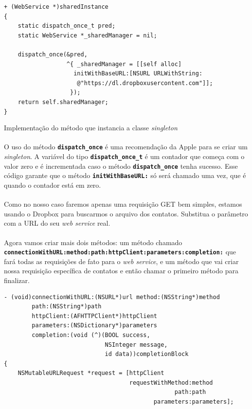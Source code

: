 \documentclass[a4paper,12pt,brazil,doubleside]{book}
\begin{document}
\begin{singlespace}
\begin{listing}[H]
\begin{verbatim}
+ (WebService *)sharedInstance
{
    static dispatch_once_t pred;
    static WebService *_sharedManager = nil;
    
    dispatch_once(&pred,
                  ^{ _sharedManager = [[self alloc]
                    initWithBaseURL:[NSURL URLWithString:
                     @"https://dl.dropboxusercontent.com"]];
                   });
    return self.sharedManager;
}
\end{verbatim}
\caption{Implementação do método que instancia a classe \emph{singleton}}
\end{listing}

\paragraph{}O uso do método \texttt{\textbf{dispatch\_once}} é uma recomendação da Apple para se criar um \emph{singleton}. A variável do tipo \texttt{\textbf{dispatch\_once\_t}} é um contador que começa com o valor zero e é incrementada caso o método \texttt{\textbf{dispatch\_once}} tenha sucesso. Esse código garante que o método \texttt{\textbf{initWithBaseURL:}} só será chamado uma vez, que é quando o contador está em zero.
\paragraph{}Como no nosso caso faremos apenas uma requisição GET bem simples, estamos usando o Dropbox para buscarmos o arquivo dos contatos. Substitua o parâmetro com a URL do seu \emph{web service} real.
\paragraph{}Agora vamos criar mais dois métodos: um método chamado \\ \texttt{\textbf{connectionWithURL:method:path:httpClient:parameters:completion:}} que fará todas as requisições de fato para o \emph{web service}, e um método que vai criar nossa requisição específica de contatos e então chamar o primeiro método para finalizar.

\begin{listing}[H]
\begin{verbatim}
- (void)connectionWithURL:(NSURL*)url method:(NSString*)method
        path:(NSString*)path
        httpClient:(AFHTTPClient*)httpClient
        parameters:(NSDictionary*)parameters
        completion:(void (^)(BOOL success,
                             NSInteger message,
                             id data))completionBlock
{
    NSMutableURLRequest *request = [httpClient
                                    requestWithMethod:method
                                                 path:path
                                           parameters:parameters];
    

\end{verbatim}
\end{listing}
\end{singlespace}
\end{document}
